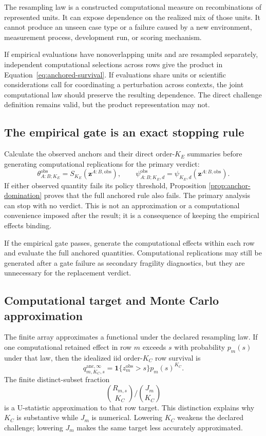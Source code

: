 \documentclass[11pt]{article}
\theoremstyle{remark}
\begin{document}
The resampling law is a constructed computational measure on recombinations of
represented units. It can expose dependence on the realized mix of those
units. It cannot produce an unseen case type or a failure caused by a new
environment, measurement process, development run, or scoring mechanism.

If empirical evaluations have nonoverlapping units and are resampled
separately, independent computational selections across rows give the product
in Equation~\eqref{eq:anchored-survival}. If evaluations share units or
scientific considerations call for coordinating a perturbation across
contexts, the joint computational law should preserve the resulting
dependence. The direct challenge definition remains valid, but the product
representation may not.

\subsection{The empirical gate is an exact stopping rule}

Calculate the observed anchors and their direct order-$K_E$ summaries before
generating computational replications for the primary verdict:
\[
\theta^{\mathrm{obs}}_{A:B;K_E}
=S_{K_E}(\mathbf z^{A:B,\mathrm{obs}}),
\qquad
\psi^{\mathrm{obs}}_{A:B;K_E,d}
=\psi_{K_E,d}(\mathbf z^{A:B,\mathrm{obs}}).
\]
If either observed quantity fails its policy threshold, Proposition
\ref{prop:anchor-domination} proves that the full anchored rule also fails.
The primary analysis can stop with no verdict. This is not an approximation or
a computational convenience imposed after the result; it is a consequence of
keeping the empirical effects binding.

If the empirical gate passes, generate the computational effects within each
row and evaluate the full anchored quantities. Computational replications may
still be generated after a gate failure as secondary fragility diagnostics,
but they are unnecessary for the replacement verdict.

\subsection{Computational target and Monte Carlo approximation}

The finite array approximates a functional under the declared resampling law.
If one computational retained effect in row $m$ exceeds $s$ with probability
$p_m(s)$ under that law, then the idealized iid order-$K_C$ row survival is
\begin{equation}
q^{\mathrm{anc},\infty}_{m,K_C,s}
=
\mathbf 1\{z_m^{\mathrm{obs}}>s\}p_m(s)^{K_C}.
\label{eq:ideal-row-survival}
\end{equation}
The finite distinct-subset fraction
\[
\binom{R_{m,s}}{K_C}/\binom{J_m}{K_C}
\]
is a U-statistic approximation to that row target. This distinction explains
why $K_C$ is substantive while $J_m$ is numerical. Lowering $K_C$ weakens the
declared challenge; lowering $J_m$ makes the same target less accurately
approximated.
\end{document}
